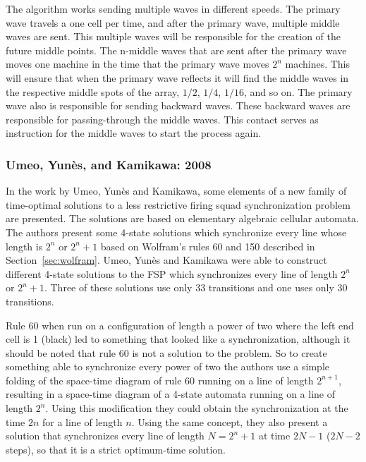 \documentclass{article}
\begin{document}
The algorithm works sending multiple waves in different speeds. The primary wave travels a one cell per time, and after the primary wave, multiple middle waves are sent. This multiple waves will be responsible for the creation of the future middle points. The n-middle waves that are sent after the primary wave moves one machine in the time that the primary wave moves $2^n$ machines. This will ensure that when the primary wave reflects it will find the middle waves in the respective middle spots of the array, $1/2$, $1/4$, $1/16$, and so on. The primary wave also is responsible for sending backward waves. These backward waves are responsible for passing-through the middle waves. This contact serves as instruction for the middle waves to start the process again. 

\subsubsection{Umeo, Yun\`{e}s, and Kamikawa: 2008}
In the work by Umeo, Yun\`{e}s and Kamikawa\cite{umeo20084}, some elements of a new family of time-optimal solutions to a less restrictive firing squad synchronization problem are presented. The solutions are based on elementary algebraic cellular automata. The authors present some 4-state solutions which synchronize every line whose length is $2^n$ or $2^n + 1$ based on Wolfram's rules 60 and 150 described in Section~\ref{sec:wolfram}. Umeo, Yun\`{e}s and Kamikawa were able to construct different 4-state solutions to the FSP which synchronizes every line of length $2^n$ or $2^n + 1$. Three of these solutions use only 33 transitions and one uses only 30 transitions.

Rule 60 when run on a configuration of length a power of two where the left end cell is 1 (black) led to something that looked like a synchronization, although it should be noted that rule 60 is not a solution to the problem. So to create something able to synchronize every power of two the authors use a simple folding of the space-time diagram 
of rule 60 running on a line of length $2^{n+1}$, resulting in a space-time diagram of a 4-state automata running on a line of length $2^n$. Using this modification they could obtain the synchronization at the time $2n$ for a line of length $n$. Using the same concept, they also present a solution that synchronizes every line of length $N = 2^n + 1$ at time $2N - 1$ ($2N - 2$ steps), so that it is a strict optimum-time solution.
\end{document}

